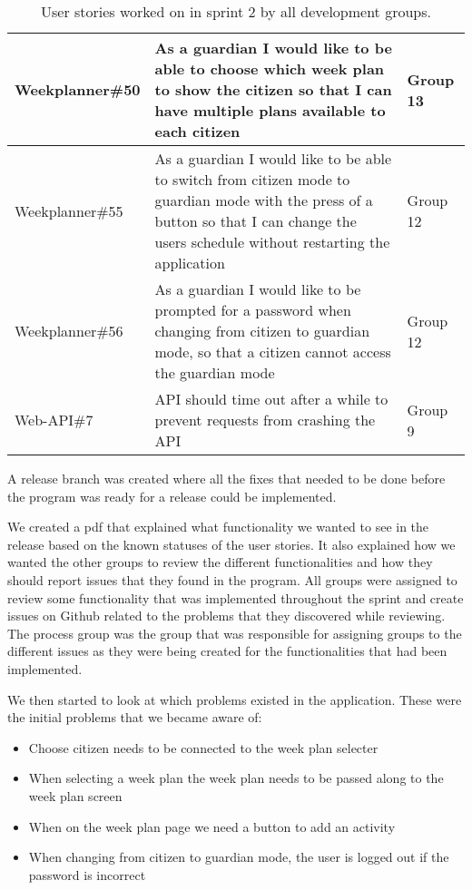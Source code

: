 \begin{table}[H]
\begin{tabular}{|p{2.8cm}|p{7cm}|p{2cm}|}
    Weekplanner\#50 & As a guardian I would like to be able to choose which week plan to show the citizen so that I can have multiple plans available to each citizen                                          & Group 13            \\ \hline
    Weekplanner\#55 & As a guardian I would like to be able to switch from citizen mode to guardian mode with the press of a button so that I can change the users schedule without restarting the application & Group 12            \\ \hline
    Weekplanner\#56 & As a guardian I would like to be prompted for a password when changing from citizen to guardian mode, so that a citizen cannot access the guardian mode                                  & Group 12            \\ \hline
    Web-API\#7      & API should time out after a while to prevent requests from crashing the API                                                                                                              & Group 9             \\ \hline
    \end{tabular}
    \caption{User stories worked on in sprint 2 by all development groups.}\label{table:user-stories-sprint-2-release}
\end{table}

\noindent A release branch was created where all the fixes that needed to be done before the program was ready for a release could be implemented.

\noindent We created a pdf that explained what functionality we wanted to see in the release based on the known statuses of the user stories.
It also explained how we wanted the other groups to review the different functionalities and how they should report issues that they found in the program.
All groups were assigned to review some functionality that was implemented throughout the sprint and create issues on Github related to the problems that they discovered while reviewing. 
The process group was the group that was responsible for assigning groups to the different issues as they were being created for the functionalities that had been implemented. 

\noindent We then started to look at which problems existed in the application.
These were the initial problems that we became aware of:
\begin{itemize}
    \item Choose citizen needs to be connected to the week plan selecter
    \item When selecting a week plan the week plan needs to be passed along to the week plan screen
    \item When on the week plan page we need a button to add an activity
    \item When changing from citizen to guardian mode, the user is logged out if the password is incorrect
\end{itemize}

